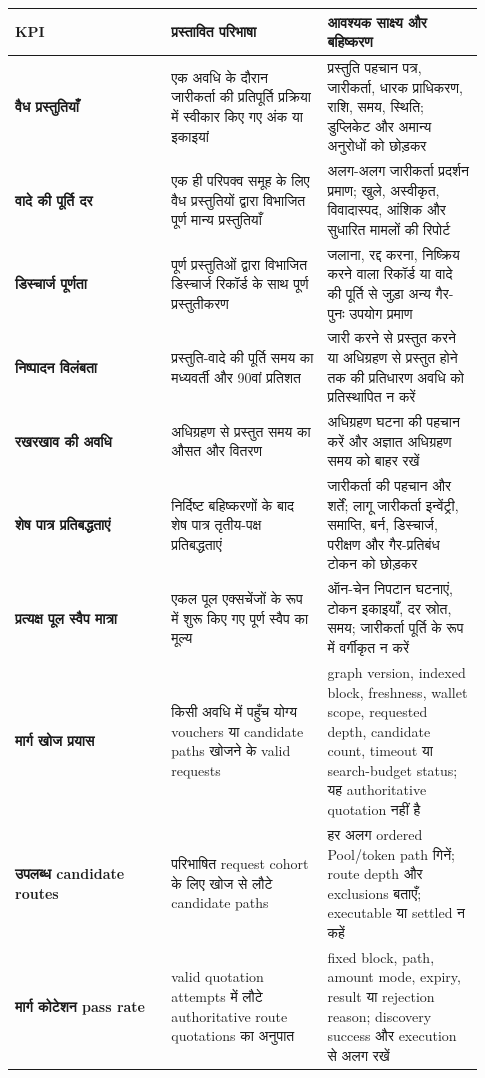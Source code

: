 \documentclass[11pt]{article}
\begin{document}
\begin{longtable}{P{0.31\linewidth} P{0.31\linewidth} P{0.31\linewidth}}
\toprule
KPI & प्रस्तावित परिभाषा & आवश्यक साक्ष्य और बहिष्करण \\
\midrule
\endhead
\textbf{वैध प्रस्तुतियाँ} & एक अवधि के दौरान जारीकर्ता की प्रतिपूर्ति प्रक्रिया में स्वीकार किए गए अंक या इकाइयां & प्रस्तुति पहचान पत्र, जारीकर्ता, धारक प्राधिकरण, राशि, समय, स्थिति; डुप्लिकेट और अमान्य अनुरोधों को छोड़कर \\
\textbf{वादे की पूर्ति दर} & एक ही परिपक्व समूह के लिए वैध प्रस्तुतियों द्वारा विभाजित पूर्ण मान्य प्रस्तुतियाँ & अलग-अलग जारीकर्ता प्रदर्शन प्रमाण; खुले, अस्वीकृत, विवादास्पद, आंशिक और सुधारित मामलों की रिपोर्ट \\
\textbf{डिस्चार्ज पूर्णता} & पूर्ण प्रस्तुतिओं द्वारा विभाजित डिस्चार्ज रिकॉर्ड के साथ पूर्ण प्रस्तुतीकरण & जलाना, रद्द करना, निष्क्रिय करने वाला रिकॉर्ड या वादे की पूर्ति से जुड़ा अन्य गैर-पुनः उपयोग प्रमाण \\
\textbf{निष्पादन विलंबता} & प्रस्तुति-वादे की पूर्ति समय का मध्यवर्ती और 90वां प्रतिशत & जारी करने से प्रस्तुत करने या अधिग्रहण से प्रस्तुत होने तक की प्रतिधारण अवधि को प्रतिस्थापित न करें \\
\textbf{रखरखाव की अवधि} & अधिग्रहण से प्रस्तुत समय का औसत और वितरण & अधिग्रहण घटना की पहचान करें और अज्ञात अधिग्रहण समय को बाहर रखें \\
\textbf{शेष पात्र प्रतिबद्धताएं} & निर्दिष्ट बहिष्करणों के बाद शेष पात्र तृतीय-पक्ष प्रतिबद्धताएं & जारीकर्ता की पहचान और शर्तें; लागू जारीकर्ता इन्वेंट्री, समाप्ति, बर्न, डिस्चार्ज, परीक्षण और गैर-प्रतिबंध टोकन को छोड़कर \\
\textbf{प्रत्यक्ष पूल स्वैप मात्रा} & एकल पूल एक्सचेंजों के रूप में शुरू किए गए पूर्ण स्वैप का मूल्य & ऑन-चेन निपटान घटनाएं, टोकन इकाइयाँ, दर स्रोत, समय; जारीकर्ता पूर्ति के रूप में वर्गीकृत न करें \\
\textbf{मार्ग खोज प्रयास} & किसी अवधि में पहुँच योग्य vouchers या candidate paths खोजने के valid requests & graph version, indexed block, freshness, wallet scope, requested depth, candidate count, timeout या search-budget status; यह authoritative quotation नहीं है \\
\textbf{उपलब्ध candidate routes} & परिभाषित request cohort के लिए खोज से लौटे candidate paths & हर अलग ordered Pool/token path गिनें; route depth और exclusions बताएँ; executable या settled न कहें \\
\textbf{मार्ग कोटेशन pass rate} & valid quotation attempts में लौटे authoritative route quotations का अनुपात & fixed block, path, amount mode, expiry, result या rejection reason; discovery success और execution से अलग रखें \\

\end{longtable}
\end{document}
